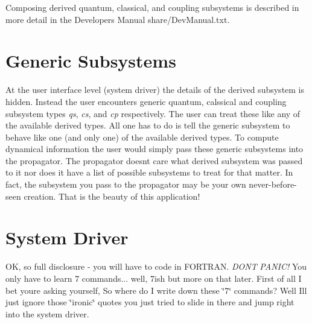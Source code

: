 Composing derived quantum, classical, and coupling subsystems is described in more detail in the Developer\textquotesingle{}s Manual share/\+Dev\+Manual.\+txt.\hypertarget{_overview_Generic_Subsystems}{}\section{Generic Subsystems}\label{_overview_Generic_Subsystems}
At the user interface level (system driver) the details of the derived subsystem is hidden. Instead the user encounters generic quantum, calssical and coupling subsystem types {\itshape qs}, {\itshape cs}, and {\itshape cp} respectively. The user can treat these like any of the available derived types. All one has to do is tell the generic subsystem to behave like one (and only one) of the available derived types. To compute dynamical information the user would simply pass these generic subsystems into the propagator. The propagator doesn\textquotesingle{}t care what derived subsystem was passed to it nor does it have a list of possible subsystems to treat for that matter. In fact, the subsystem you pass to the propagator may be your own never-\/before-\/seen creation. That is the beauty of this application!\hypertarget{_overview_System_Driver}{}\section{System Driver}\label{_overview_System_Driver}
OK, so full disclosure -\/ you will have to code in F\+O\+R\+T\+R\+AN. {\itshape D\+ON\textquotesingle{}T} {\itshape P\+A\+N\+I\+C!} You only have to learn 7 commands... well, 7ish but more on that later. First of all I bet you\textquotesingle{}re asking yourself, \textquotesingle{}So where do I write down these \char`\"{}7\char`\"{} commands?\textquotesingle{} Well I\textquotesingle{}ll just ignore those \char`\"{}ironic\char`\"{} quotes you just tried to slide in there and jump right into the system driver.

